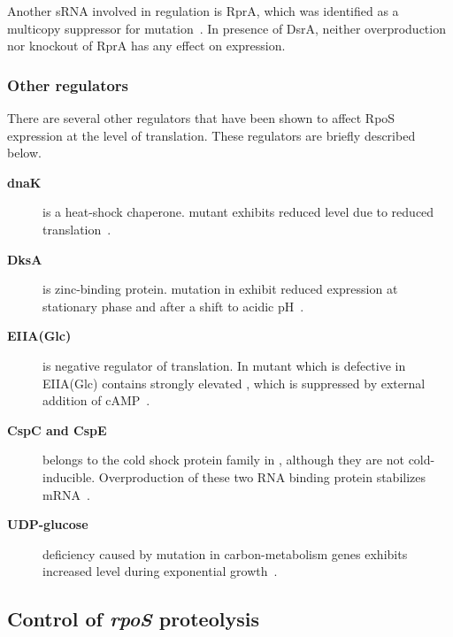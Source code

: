 Another sRNA involved in  regulation is RprA, which was
identified as a multicopy suppressor for 
mutation~\citep{Majdalani2001}. In presence of DsrA, neither
overproduction nor knockout of RprA has any effect on 
expression.

\subsubsection{Other regulators}

There are several other regulators that have been shown to affect
RpoS expression at the level of translation. These regulators are
briefly described below.

\begin{description}

\item[\textbf{dnaK}] is a heat-shock chaperone\@.  mutant
exhibits reduced \sigs{} level due to reduced 
translation~\citep{Muffler1997,Rockabrand1998}.

\item[\textbf{DksA}] is zinc-binding protein.  mutation in
 exhibit reduced \sigs{} expression at stationary
phase and after a shift to acidic pH~\citep{Webb1999}.

\item[\textbf{EIIA(Glc)}] is negative regulator of 
translation\@. In  mutant which is defective in EIIA(Glc)
contains strongly elevated \sigs{}, which is suppressed by
external addition of cAMP~\citep{Ueguchi2001}.

\item[\textbf{CspC and CspE}] belongs to the cold shock protein
family in , although they are not cold-inducible.
Overproduction of these two RNA binding protein stabilizes
 mRNA~\citep{Phadtare2001}.

\item[\textbf{UDP-glucose}] deficiency caused by mutation in
carbon-metabolism genes exhibits increased \sigs{} level during
exponential growth~\citep{Bohringer1995}.

\end{description}



\subsection{Control of \emph{rpoS} proteolysis}
\label{chap1_rssb}

